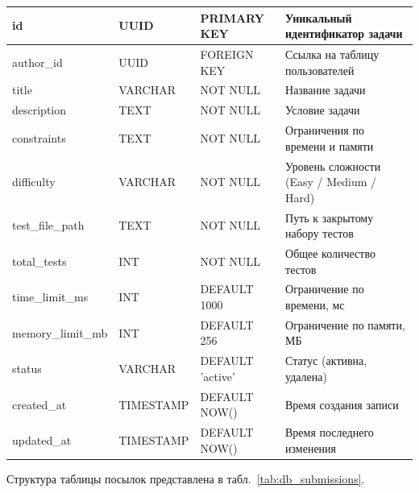 \begin{longtable}{|l|l|p{3.5cm}|p{5.5cm}|}
	id                & UUID         & PRIMARY KEY          & Уникальный идентификатор задачи          \\ \hline
	author\_id        & UUID         & FOREIGN KEY          & Ссылка на таблицу пользователей          \\ \hline
	title             & VARCHAR      & NOT NULL             & Название задачи                          \\ \hline
	description       & TEXT         & NOT NULL             & Условие задачи                           \\ \hline
	constraints       & TEXT         & NOT NULL             & Ограничения по времени и памяти          \\ \hline
	difficulty        & VARCHAR      & NOT NULL             & Уровень сложности (Easy / Medium / Hard) \\ \hline
	test\_file\_path  & TEXT         & NOT NULL             & Путь к закрытому набору тестов           \\ \hline
	total\_tests      & INT          & NOT NULL             & Общее количество тестов                  \\ \hline
	time\_limit\_ms   & INT          & DEFAULT 1000         & Ограничение по времени, мс               \\ \hline
	memory\_limit\_mb & INT          & DEFAULT 256          & Ограничение по памяти, МБ                \\ \hline
	status            & VARCHAR      & DEFAULT 'active'     & Статус (активна, удалена)                \\ \hline
	created\_at       & TIMESTAMP    & DEFAULT NOW()        & Время создания записи                    \\ \hline
	updated\_at       & TIMESTAMP    & DEFAULT NOW()        & Время последнего изменения               \\ \hline
\end{longtable}

Структура таблицы посылок представлена в табл.~\ref{tab:db_submissions}.

